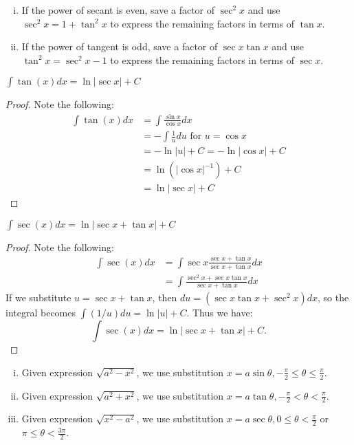 \documentclass[a4paper,11pt]{article}
\begin{document}
\begin{outline}
    \begin{enumerate}[i.]
      \item
        If the power of secant is even, save a factor of \(\sec^2x\) and use \(\sec^2x=1+\tan^2x\) to express the
        remaining factors in terms of \(\tan{x}\).
      \item
        If the power of tangent is odd, save a factor of \(\sec{x}\tan{x}\) and use \(\tan^2x=\sec^2x-1\) to express
        the remaining factors in terms of \(\sec{x}\).
    \end{enumerate}

    \(\int\tan{(x)}dx = \ln{|\sec{x}|} + C\)
    
    \begin{proof}
      Note the following:
      \begin{align*}
        \int\tan{(x)}dx &= \int\frac{\sin{x}}{\cos{x}}dx \\
                        &= -\int\frac{1}{u}du \text{ for } u=\cos{x}\\
                        &= -\ln{|u|} + C = -\ln{|\cos{x}|} + C \\
                        &= \ln{(|\cos{x}|^{-1})} + C \\
                        &= \ln{|\sec{x}|} + C
      \end{align*}
    \end{proof}
    
    \(\int\sec{(x)}dx = \ln{|\sec{x}+\tan{x}|} + C\)
    
    \begin{proof}
      Note the following:
      \begin{align*}
        \int\sec{(x)}dx &= \int\sec{x}\frac{\sec{x}+\tan{x}}{\sec{x}+\tan{x}}dx \\
                        &= \int\frac{\sec^2x+\sec{x}\tan{x}}{\sec{x}+\tan{x}}dx
      \end{align*}
      If we substitute \(u=\sec{x}+\tan{x}\), then \(du=(\sec{x}\tan{x}+\sec^2{x})dx\), so the integral
      becomes \(\int(1/u)du = \ln{|u|} + C\). Thus we have: \[ \int\sec{(x)}dx = \ln{|\sec{x}+\tan{x}|} + 
      C\text{.} \]
    \end{proof}
    
    \begin{enumerate}[i.]
      \item 
        Given expression \(\sqrt{a^2-x^2}\), we use substitution \(x=a\sin{\theta}, -\frac{\pi}{2}
        \leq\theta\leq\frac{\pi}{2}\).
      \item
        Given expression \(\sqrt{a^2+x^2}\), we use substitution \(x=a\tan{\theta}, -\frac{\pi}{2}
        < \theta < \frac{\pi}{2}\).
      \item 
        Given expression \(\sqrt{x^2-a^2}\), we use substitution \(x=a\sec{\theta}, 0\leq\theta<\frac{\pi}{2}\)
        or \(\pi\leq\theta<\frac{3\pi}{2}\).
    \end{enumerate}
    

\end{outline}
\end{document}
